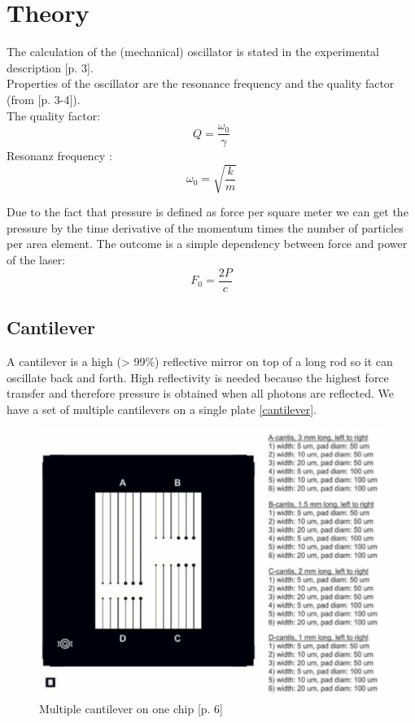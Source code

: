 \documentclass[12pt,a4paper]{article}
\begin{document}
\section{Theory}
\label{theory}
The calculation of the (mechanical) oscillator is stated in the experimental description \cite{physikwiki}[p. 3].\\
Properties of the oscillator are the resonance frequency and the quality factor (from \cite{physikwiki}[p. 3-4]).\\
The quality factor:
$$Q = \frac{\omega_{0}}{\gamma}$$
Resonanz frequency :
$$\omega_0 = \sqrt{\frac{k}{m}}$$

Due to the fact that pressure is defined as force per square meter we can get the pressure by the time derivative of the momentum times the number of particles per area element. The outcome is a simple dependency between force and power of the laser:
$$F_0 = \frac{2P}{c}$$

\subsection{Cantilever}
A cantilever is a high (> 99\%) reflective mirror on top of a long rod so it can oscillate back and forth.
High reflectivity is needed because the highest force transfer and therefore pressure is obtained when all photons are reflected. We have a set of multiple cantilevers on a single plate \ref{cantilever}.
\begin{figure}[H]
	\centering
	\includegraphics[scale=2]{../figures/cantilever.png}
	\caption{Multiple cantilever on one chip \cite{physikwiki}[p. 6]}
	\label{fig:cantilever}
\end{figure}
\end{document}

